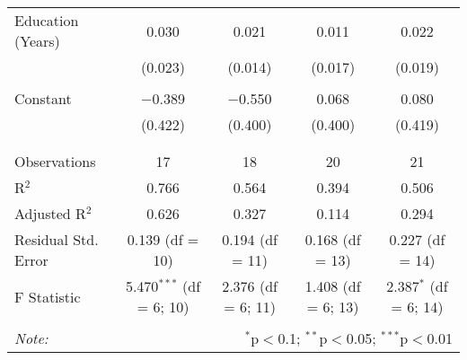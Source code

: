 \begin{table}[!htbp]
\begin{tabular}{@{\extracolsep{5pt}}lcccc}
 Education (Years) & 0.030 & 0.021 & 0.011 & 0.022 \\ 
  & (0.023) & (0.014) & (0.017) & (0.019) \\ 
  & & & & \\ 
 Constant & $-$0.389 & $-$0.550 & 0.068 & 0.080 \\ 
  & (0.422) & (0.400) & (0.400) & (0.419) \\ 
  & & & & \\ 
\hline \\[-1.8ex] 
Observations & 17 & 18 & 20 & 21 \\ 
R$^{2}$ & 0.766 & 0.564 & 0.394 & 0.506 \\ 
Adjusted R$^{2}$ & 0.626 & 0.327 & 0.114 & 0.294 \\ 
Residual Std. Error & 0.139 (df = 10) & 0.194 (df = 11) & 0.168 (df = 13) & 0.227 (df = 14) \\ 
F Statistic & 5.470$^{***}$ (df = 6; 10) & 2.376 (df = 6; 11) & 1.408 (df = 6; 13) & 2.387$^{*}$ (df = 6; 14) \\ 
\hline 
\hline \\[-1.8ex] 
\textit{Note:}  & \multicolumn{4}{r}{$^{*}$p$<$0.1; $^{**}$p$<$0.05; $^{***}$p$<$0.01} \\ 
\end{tabular} 
\end{table} 
